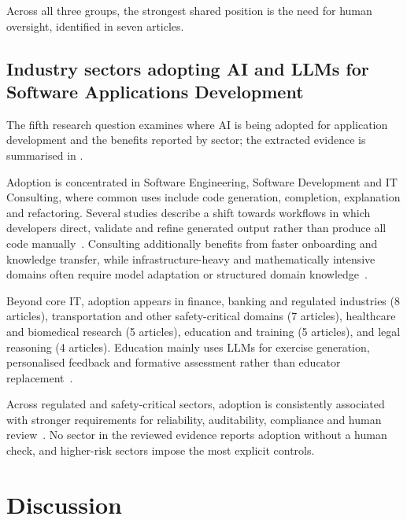 Across all three groups, the strongest shared position is the need for human oversight, identified in seven articles.


\subsection{Industry sectors adopting AI and LLMs for Software Applications Development}

The fifth research question examines where \ac{AI} is being adopted for application development and the benefits reported by sector; the extracted evidence is summarised in .

Adoption is concentrated in Software Engineering, Software Development and IT Consulting, where common uses include code generation, completion, explanation and refactoring. Several studies describe a shift towards workflows in which developers direct, validate and refine generated output rather than produce all code manually~\cite{Jensen:2025me, Zhang:2025ea, Kim:2025ao}. Consulting additionally benefits from faster onboarding and knowledge transfer, while infrastructure-heavy and mathematically intensive domains often require model adaptation or structured domain knowledge~\cite{Wang:2025rs, Hou:2025cl, Ahmed:2025ai, AlHashimi:2025er}.

Beyond core IT, adoption appears in finance, banking and regulated industries (8 articles), transportation and other safety-critical domains (7 articles), healthcare and biomedical research (5 articles), education and training (5 articles), and legal reasoning (4 articles). Education mainly uses \acp{LLM} for exercise generation, personalised feedback and formative assessment rather than educator replacement~\cite{Ramos:2025aa, Hemmat:2025rd, Zamfiroiu:2025ec}.

Across regulated and safety-critical sectors, adoption is consistently associated with stronger requirements for reliability, auditability, compliance and human review~\cite{Moore:2025vc, Ahmed:2025ai, Jabrw:2025ss, Qiu:2025ft}. No sector in the reviewed evidence reports adoption without a human check, and higher-risk sectors impose the most explicit controls.

\section{Discussion}

